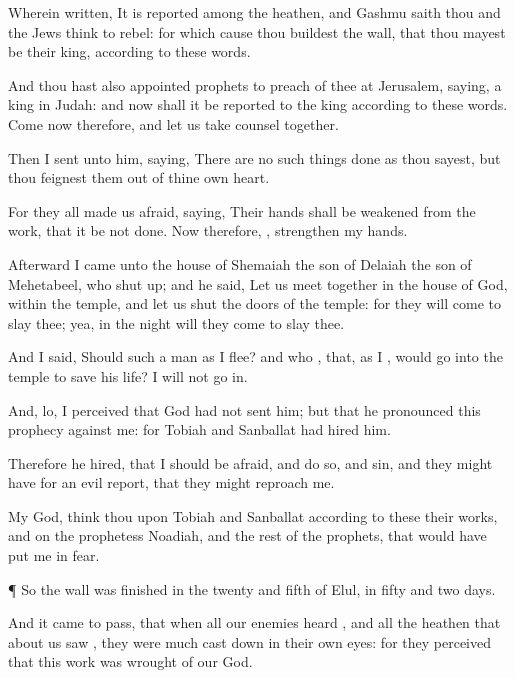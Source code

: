 {Wherein
{}
written, It is
reported among the
heathen, and
Gashmu
saith
{} thou and the
Jews
think to
rebel: for which
cause thou
buildest the
wall, that thou mayest
be their
king, according to these
words.

And thou hast also
appointed
prophets to
preach of thee at
Jerusalem,
saying,
{} a
king in
Judah: and now shall it be
reported to the
king according to these
words.
Come now therefore, and let us take
counsel
together.

Then I
sent unto him,
saying, There
are no such
things
done as thou
sayest, but thou
feignest them out of thine own
heart.

For they all made us
afraid,
saying, Their
hands shall be
weakened from the
work, that it be not
done. Now therefore,
{},
strengthen my
hands.


\par }{\PP {}Afterward I
came unto the
house of
Shemaiah the
son of
Delaiah the
son of
Mehetabeel, who
{} shut
up; and he
said, Let us meet
together in the
house of
God,
within the
temple, and let us
shut the
doors of the
temple: for they will
come to
slay thee; yea, in the
night will they
come to
slay thee.

And I
said, Should
such a
man as I
flee? and who
{}, that,
{} as I
{}, would
go into the
temple to save his
life? I will not go
in.

And, lo, I
perceived that
God had not
sent him; but that he
pronounced this
prophecy against me: for
Tobiah and
Sanballat had
hired him.

Therefore
{} he
hired, that I should be
afraid, and do
so, and
sin, and
{} they might have
{} for an
evil
report, that they might
reproach me.

My
God,
think thou upon
Tobiah and
Sanballat according to these their
works, and on the
prophetess
Noadiah, and the
rest of the
prophets, that would have put me in
fear.


\par }{\PP {}¶ So the
wall was
finished in the
twenty and
fifth
{} of
{}
Elul, in
fifty and
two
days.

And it came to pass, that when all our
enemies
heard
{}, and all the
heathen that
{} about
us
saw
{}, they were
much cast
down in their own
eyes: for they
perceived that this
work was
wrought of our
God.


}
